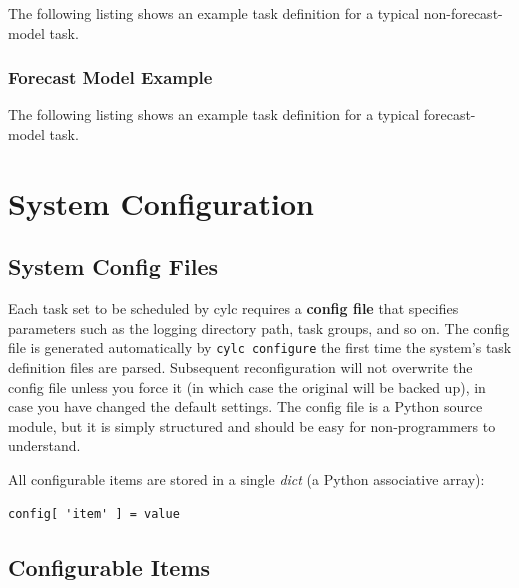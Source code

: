 \documentclass[11pt,a4paper]{article}
\begin{document}
The following listing shows an example task definition for a
typical non-forecast-model task.
\lstset{language=cylctaskdef}

{

}

\subsubsection{Forecast Model Example}

The following listing shows an example task definition for a
typical forecast-model task.

\lstset{language=cylctaskdef}

{

}


\section{System Configuration}
\label{SystemConfiguration}

\subsection{System Config Files}
\label{SystemConfigFiles}

Each task set to be scheduled by cylc requires a {\bf config file} that
specifies parameters such as the logging directory path, task groups,
and so on. The config file is generated automatically by 
\lstinline=cylc configure= the first time the system's task definition
files are parsed. Subsequent reconfiguration will not overwrite the
config file unless you force it (in which case the original will be
backed up), in case you have changed the default settings. The config
file is a Python source module, but it is simply structured and should
be easy for non-programmers to understand. 

All configurable items are stored in a single {\em dict} (a Python
associative array):

\lstset{language=Python}
\begin{lstlisting}
config[ 'item' ] = value
\end{lstlisting}

\subsection{Configurable Items}
\label{ConfigurableItems}
\end{document}
